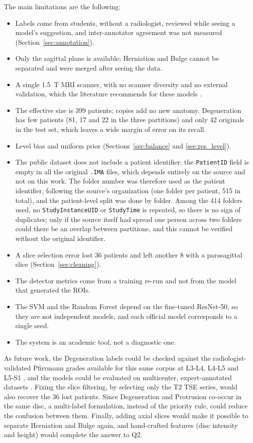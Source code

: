 The main limitations are the following:
\begin{itemize}
  \item Labels come from students, without a radiologist, reviewed while seeing a model's suggestion, and inter-annotator agreement was not measured (Section~\ref{sec:annotation}).
  \item Only the sagittal plane is available; Herniation and Bulge cannot be separated and were merged after seeing the data.
  \item A single 1.5~T MRI scanner, with no scanner diversity and no external validation, which the literature recommends for these models \cite{nigru2024,wang2025}.
  \item The effective size is 399 patients; copies add no new anatomy. Degeneration has few patients (81, 17 and 22 in the three partitions) and only 42 originals in the test set, which leaves a wide margin of error on its recall.
  \item Level bias and uniform prior (Sections~\ref{sec:balance} and \ref{sec:res_level}).
  \item The public dataset does not include a patient identifier: the \texttt{PatientID} field is empty in all the original \texttt{.IMA} files, which depends entirely on the source and not on this work. The folder number was therefore used as the patient identifier, following the source's organization (one folder per patient, 515 in total), and the patient-level split was done by folder. Among the 414 folders used, no \texttt{StudyInstanceUID} or \texttt{StudyTime} is repeated, so there is no sign of duplicates; only if the source itself had spread one person across two folders could there be an overlap between partitions, and this cannot be verified without the original identifier.
  \item A slice selection error lost 36 patients and left another 8 with a parasagittal slice (Section~\ref{sec:cleaning}).
  \item The detector metrics come from a training re-run and not from the model that generated the ROIs.
  \item The SVM and the Random Forest depend on the fine-tuned ResNet-50, so they are not independent models, and each official model corresponds to a single seed.
  \item The system is an academic tool, not a diagnostic one.
\end{itemize}

As future work, the Degeneration labels could be checked against the radiologist-validated Pfirrmann grades available for this same corpus at L3-L4, L4-L5 and L5-S1 \cite{masood2026}, and the models could be evaluated on multicenter, expert-annotated datasets \cite{richards2026}. Fixing the slice filtering, by selecting only the T2 TSE series, would also recover the 36 lost patients. Since Degeneration and Protrusion co-occur in the same disc, a multi-label formulation, instead of the priority rule, could reduce the confusion between them. Finally, adding axial slices would make it possible to separate Herniation and Bulge again, and hand-crafted features (disc intensity and height) would complete the answer to Q2.
